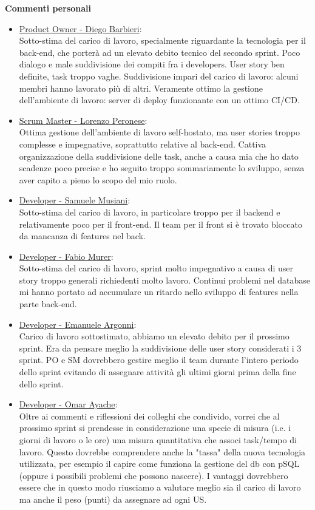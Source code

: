 \documentclass{article}
\begin{document}
\textbf{Commenti personali}
\begin{itemize}
    \item \underline{Product Owner - Diego Barbieri}: \\
    Sotto-stima del carico di lavoro, specialmente riguardante la tecnologia per il back-end, che porterà ad un elevato debito tecnico del secondo sprint.
    Poco dialogo e male suddivisione dei compiti fra i developers. User story ben definite, task troppo vaghe. Suddivisione impari del carico di lavoro: 
    alcuni membri hanno lavorato più di altri.
    Veramente ottimo la gestione dell'ambiente di lavoro: server di deploy funzionante con un ottimo CI/CD.

    \item \underline{Scrum Master - Lorenzo Peronese}: \\
    Ottima gestione dell'ambiente di lavoro self-hostato, ma user stories troppo complesse e impegnative, soprattutto relative al back-end.
    Cattiva organizzazione della suddivisione delle task, anche a causa mia che ho dato scadenze poco precise
    e ho seguito troppo sommariamente lo sviluppo, senza aver capito a pieno lo scopo del mio ruolo.

    \item \underline{Developer - Samuele Musiani}: \\
    Sotto-stima del carico di lavoro, in particolare troppo per il backend e relativamente poco per il front-end.
    Il team per il front si è trovato bloccato da mancanza di features nel back.

    \item \underline{Developer - Fabio Murer}: \\
    Sotto-stima del carico di lavoro, sprint molto impegnativo a causa di user story troppo generali richiedenti molto lavoro.
    Continui problemi nel database mi hanno portato ad accumulare un ritardo nello sviluppo di features nella parte back-end.

    \item \underline{Developer - Emanuele Argonni}: \\
    Carico di lavoro sottostimato, abbiamo un elevato debito per il prossimo sprint. Era da pensare meglio la suddivisione delle user story considerati i 3 sprint. 
    PO e SM dovrebbero gestire meglio il team durante l'intero periodo dello sprint evitando di assegnare attività gli ultimi giorni prima della fine dello sprint.

    \item \underline{Developer - Omar Ayache}:\\
    Oltre ai commenti e riflessioni dei colleghi che condivido, vorrei che al prossimo sprint si prendesse in considerazione una specie di misura (i.e. i giorni 
    di lavoro o le ore) una misura quantitativa che associ task/tempo di lavoro. Questo dovrebbe comprendere anche la "tassa" della nuova tecnologia utilizzata, 
    per esempio il capire come funziona la gestione del db con pSQL (oppure i possibili problemi che possono nascere).
    I vantaggi dovrebbero essere che in questo modo riusciamo a valutare meglio sia il carico di lavoro ma anche il peso (punti) da assegnare ad ogni US.
\end{itemize} 
\end{document}
